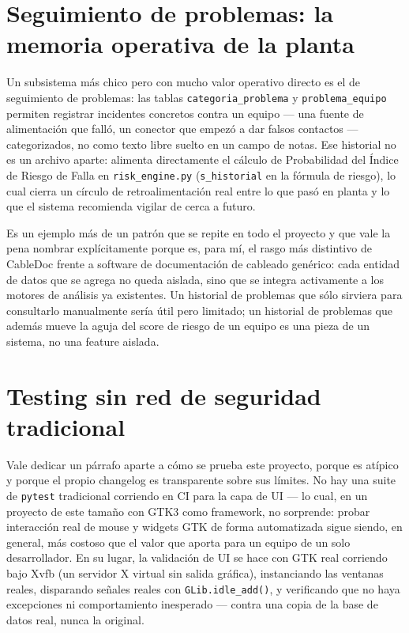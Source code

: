 \documentclass[11pt,twocolumn]{article}
\begin{document}
\section{Seguimiento de problemas: la memoria operativa de la planta}

Un subsistema más chico pero con mucho valor operativo directo es el de seguimiento de problemas: las tablas \texttt{categoria\_problema} y \texttt{problema\_equipo} permiten registrar incidentes concretos contra un equipo --- una fuente de alimentación que falló, un conector que empezó a dar falsos contactos --- categorizados, no como texto libre suelto en un campo de notas. Ese historial no es un archivo aparte: alimenta directamente el cálculo de Probabilidad del Índice de Riesgo de Falla en \texttt{risk\_engine.py} (\texttt{s\_historial} en la fórmula de riesgo), lo cual cierra un círculo de retroalimentación real entre lo que pasó en planta y lo que el sistema recomienda vigilar de cerca a futuro.

Es un ejemplo más de un patrón que se repite en todo el proyecto y que vale la pena nombrar explícitamente porque es, para mí, el rasgo más distintivo de CableDoc frente a software de documentación de cableado genérico: cada entidad de datos que se agrega no queda aislada, sino que se integra activamente a los motores de análisis ya existentes. Un historial de problemas que sólo sirviera para consultarlo manualmente sería útil pero limitado; un historial de problemas que además mueve la aguja del score de riesgo de un equipo es una pieza de un sistema, no una feature aislada.

\section{Testing sin red de seguridad tradicional}

Vale dedicar un párrafo aparte a cómo se prueba este proyecto, porque es atípico y porque el propio changelog es transparente sobre sus límites. No hay una suite de \texttt{pytest} tradicional corriendo en CI para la capa de UI --- lo cual, en un proyecto de este tamaño con GTK3 como framework, no sorprende: probar interacción real de mouse y widgets GTK de forma automatizada sigue siendo, en general, más costoso que el valor que aporta para un equipo de un solo desarrollador. En su lugar, la validación de UI se hace con GTK real corriendo bajo Xvfb (un servidor X virtual sin salida gráfica), instanciando las ventanas reales, disparando señales reales con \texttt{GLib.idle\_add()}, y verificando que no haya excepciones ni comportamiento inesperado --- contra una copia de la base de datos real, nunca la original.
\end{document}
